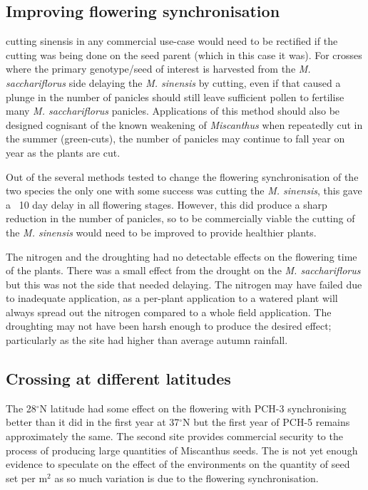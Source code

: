 \documentclass[fleqn, 15pt, lineno]{olplainarticle}
\begin{document}
\subsection{Improving flowering synchronisation}

cutting sinensis in any commercial use-case would need to be rectified if the cutting was being done on the seed parent (which in this case it was).
For crosses where the primary genotype/seed of interest is harvested from the \textit{M. sacchariflorus} side delaying the \textit{M. sinensis} by cutting, even if that caused a plunge in the number of panicles should still leave sufficient pollen to fertilise many \textit{M. sacchariflorus} panicles.
Applications of this method should also be designed cognisant of the known weakening of \textit{Miscanthus} when repeatedly cut in the summer (green-cuts), the number of panicles may continue to fall year on year as the plants are cut.

Out of the several methods tested to change the flowering synchronisation of the two species the only one with some success was cutting the \textit{M. sinensis}, this gave a ~10 day delay in all flowering stages.
However, this did produce a sharp reduction in the number of panicles, so to be commercially viable the cutting of the \textit{M. sinensis} would need to be improved to provide healthier plants.

The nitrogen and the droughting had no detectable effects on the flowering time of the plants.
There was a small effect from the drought on the \textit{M. sacchariflorus} but this was not the side that needed delaying.
The nitrogen may have failed due to inadequate application, as a per-plant application to a watered plant will always spread out the nitrogen compared to a whole field application.
The droughting may not have been harsh enough to produce the desired effect; particularly as the site had higher than average autumn rainfall.

\subsection{Crossing at different latitudes}
The 28$^{\circ}$N latitude had some effect on the flowering with PCH-3 synchronising better than it did in the first year at 37$^{\circ}$N but the first year of PCH-5 remains approximately the same.
The second site provides commercial security to the process of producing large quantities of Miscanthus seeds.
The is not yet enough evidence to speculate on the effect of the environments on the quantity of seed set per m$^2$ as so much variation is due to the flowering synchronisation.
\end{document}
